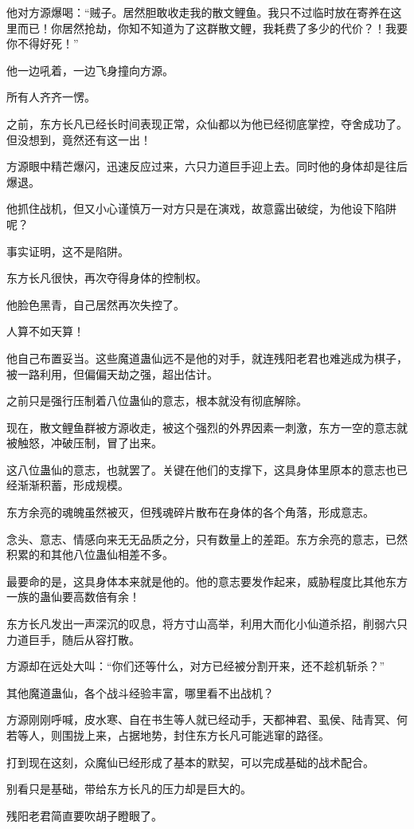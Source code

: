 \begin{this_body}
他对方源爆喝：“贼子。居然胆敢收走我的散文鲤鱼。我只不过临时放在寄养在这里而已！你居然抢劫，你知不知道为了这群散文鲤，我耗费了多少的代价？！我要你不得好死！”

他一边吼着，一边飞身撞向方源。

所有人齐齐一愣。

之前，东方长凡已经长时间表现正常，众仙都以为他已经彻底掌控，夺舍成功了。但没想到，竟然还有这一出！

方源眼中精芒爆闪，迅速反应过来，六只力道巨手迎上去。同时他的身体却是往后爆退。

他抓住战机，但又小心谨慎万一对方只是在演戏，故意露出破绽，为他设下陷阱呢？

事实证明，这不是陷阱。

东方长凡很快，再次夺得身体的控制权。

他脸色黑青，自己居然再次失控了。

人算不如天算！

他自己布置妥当。这些魔道蛊仙远不是他的对手，就连残阳老君也难逃成为棋子，被一路利用，但偏偏天劫之强，超出估计。

之前只是强行压制着八位蛊仙的意志，根本就没有彻底解除。

现在，散文鲤鱼群被方源收走，被这个强烈的外界因素一刺激，东方一空的意志就被触怒，冲破压制，冒了出来。

这八位蛊仙的意志，也就罢了。关键在他们的支撑下，这具身体里原本的意志也已经渐渐积蓄，形成规模。

东方余亮的魂魄虽然被灭，但残魂碎片散布在身体的各个角落，形成意志。

念头、意志、情感向来无无品质之分，只有数量上的差距。东方余亮的意志，已然积累的和其他八位蛊仙相差不多。

最要命的是，这具身体本来就是他的。他的意志要发作起来，威胁程度比其他东方一族的蛊仙要高数倍有余！

东方长凡发出一声深沉的叹息，将方寸山高举，利用大而化小仙道杀招，削弱六只力道巨手，随后从容打散。

方源却在远处大叫：“你们还等什么，对方已经被分割开来，还不趁机斩杀？”

其他魔道蛊仙，各个战斗经验丰富，哪里看不出战机？

方源刚刚呼喊，皮水寒、自在书生等人就已经动手，天都神君、虱侯、陆青冥、何若等人，则围拢上来，占据地势，封住东方长凡可能逃窜的路径。

打到现在这刻，众魔仙已经形成了基本的默契，可以完成基础的战术配合。

别看只是基础，带给东方长凡的压力却是巨大的。

残阳老君简直要吹胡子瞪眼了。


\end{this_body}

